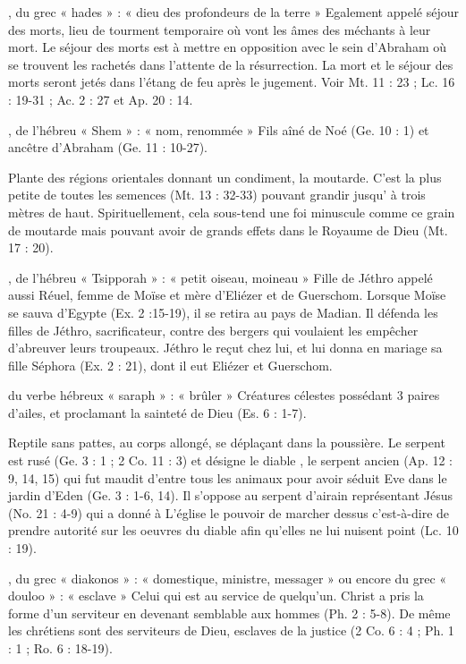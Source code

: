 \begin{multicols}{2}
, du grec « hades » : « dieu des profondeurs de la terre »
Egalement appelé séjour des morts, lieu de tourment temporaire où vont les âmes des méchants à leur mort. Le séjour des morts est à mettre en opposition avec le sein d'Abraham où se trouvent les rachetés dans l’attente de la résurrection. La mort et le séjour des morts seront jetés dans l'étang de feu après le jugement. Voir Mt. 11 : 23 ; Lc. 16 : 19-31 ; Ac. 2 : 27 et Ap. 20 : 14.


, de l'hébreu « Shem » : « nom, renommée »
Fils aîné de Noé (Ge. 10 : 1) et ancêtre d'Abraham (Ge. 11 : 10-27).


Plante des régions orientales donnant un condiment, la moutarde. C'est la plus petite de toutes les semences (Mt. 13 : 32-33) pouvant grandir jusqu' à trois mètres de haut. Spirituellement, cela sous-tend une foi minuscule comme ce grain de moutarde mais pouvant avoir de grands effets dans le Royaume de Dieu (Mt. 17 : 20).


, de l'hébreu « Tsipporah » : « petit oiseau, moineau »
Fille de Jéthro appelé aussi Réuel, femme de Moïse et mère d'Eliézer et de Guerschom. Lorsque Moïse se sauva d'Egypte (Ex. 2 :15-19), il se retira au pays de Madian. Il défenda les filles de Jéthro, sacrificateur, contre des bergers qui voulaient les empêcher d'abreuver leurs troupeaux. Jéthro le reçut chez lui, et lui donna en mariage sa fille Séphora (Ex. 2 : 21), dont il eut Eliézer et Guerschom.


du verbe hébreux « saraph » : « brûler »
Créatures célestes possédant 3 paires d'ailes, et proclamant la sainteté de Dieu (Es. 6 : 1-7).


Reptile sans pattes, au corps allongé, se déplaçant dans la poussière. Le serpent est rusé (Ge. 3 : 1 ; 2 Co. 11 : 3) et désigne le diable , le serpent ancien (Ap. 12 : 9, 14, 15) qui fut maudit d'entre tous les animaux pour avoir séduit Eve dans le jardin d'Eden (Ge. 3 : 1-6, 14). Il s'oppose au serpent d'airain représentant Jésus (No. 21 : 4-9) qui a donné à L'église le pouvoir de marcher dessus c'est-à-dire de prendre autorité sur les oeuvres du diable afin qu'elles ne lui nuisent point (Lc. 10 : 19).


, du grec « diakonos » : « domestique, ministre, messager » ou encore du grec « douloo » : « esclave »
Celui qui est au service de quelqu'un. Christ a pris la forme d'un serviteur en devenant semblable aux hommes (Ph. 2 : 5-8). De même les chrétiens sont des serviteurs de Dieu, esclaves de la justice (2 Co. 6 : 4 ; Ph. 1 : 1 ; Ro. 6 : 18-19).



\end{multicols}

